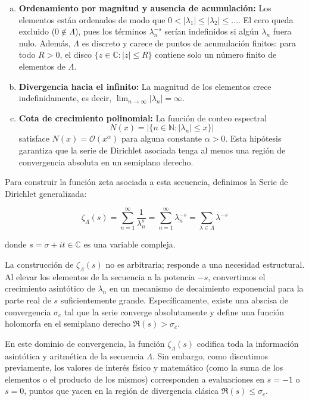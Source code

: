 \begin{enumerate}[a)]
    \item \textbf{Ordenamiento por magnitud y ausencia de acumulación:} Los elementos están ordenados de modo que $0 < |\lambda_1| \le |\lambda_2| \le \dots$. El cero queda excluido ($0 \notin \Lambda$), pues los términos $\lambda_n^{-s}$ serían indefinidos si algún $\lambda_n$ fuera nulo. Además, $\Lambda$ es discreto y carece de puntos de acumulación finitos: para todo $R>0$, el disco $\{z \in \mathbb{C}: |z| \le R\}$ contiene solo un número finito de elementos de $\Lambda$.
    \item \textbf{Divergencia hacia el infinito:} La magnitud de los elementos crece indefinidamente, es decir, $\lim_{n \to \infty} |\lambda_n| = \infty$.
    \item \textbf{Cota de crecimiento polinomial:} La función de conteo espectral
    $$ N(x)=|\{n\in\mathbb{N}: |\lambda_n|\le x\}| $$
    satisface $N(x)=\mathcal{O}(x^\alpha)$ para alguna constante $\alpha>0$. Esta hipótesis garantiza que la serie de Dirichlet asociada tenga al menos una región de convergencia absoluta en un semiplano derecho.
\end{enumerate}

Para construir la función zeta asociada a esta secuencia, definimos la Serie de Dirichlet generalizada:

$$ \zeta_\Lambda(s) = \sum_{n=1}^{\infty} \frac{1}{\lambda_n^s} = \sum_{n=1}^{\infty} \lambda_n^{-s} = \sum_{\lambda \in \Lambda} \lambda^{-s} $$

donde $s = \sigma + it \in \mathbb{C}$ es una variable compleja.

La construcción de $\zeta_\Lambda(s)$ no es arbitraria; responde a una necesidad estructural. Al elevar los elementos de la secuencia a la potencia $-s$, convertimos el crecimiento asintótico de $\lambda_n$ en un mecanismo de decaimiento exponencial para la parte real de $s$ suficientemente grande. Específicamente, existe una abscisa de convergencia $\sigma_c$ tal que la serie converge absolutamente y define una función holomorfa en el semiplano derecho $\Re(s) > \sigma_c$.

En este dominio de convergencia, la función $\zeta_\Lambda(s)$ codifica toda la información asintótica y aritmética de la secuencia $\Lambda$. Sin embargo, como discutimos previamente, los valores de interés físico y matemático (como la suma de los elementos o el producto de los mismos) corresponden a evaluaciones en $s = -1$ o $s = 0$, puntos que yacen en la región de divergencia clásica $\Re(s) \le \sigma_c$.

